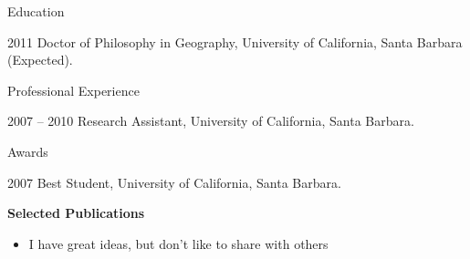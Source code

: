 \begin{vitae}
{\small

\begin{vitaesection}{Education}
\vspace{-0.1cm}
   \item [2011] Doctor of Philosophy in Geography, University of California, Santa Barbara (Expected).
\end{vitaesection}

\begin{vitaesection}{Professional Experience}
\vspace{-0.1cm}
   \item [2007 -- 2010] Research Assistant, University of California, Santa Barbara.
\end{vitaesection}

\begin{vitaesection}{Awards}
\vspace{-0.1cm}
   \item [2007] Best Student, University of California, Santa Barbara.
\end{vitaesection}
{\bf Selected Publications}
\begin{itemize}
\item I have great ideas, but don't like to share with others
\vspace{0.3cm}
\end{itemize}
}
\end{vitae}
